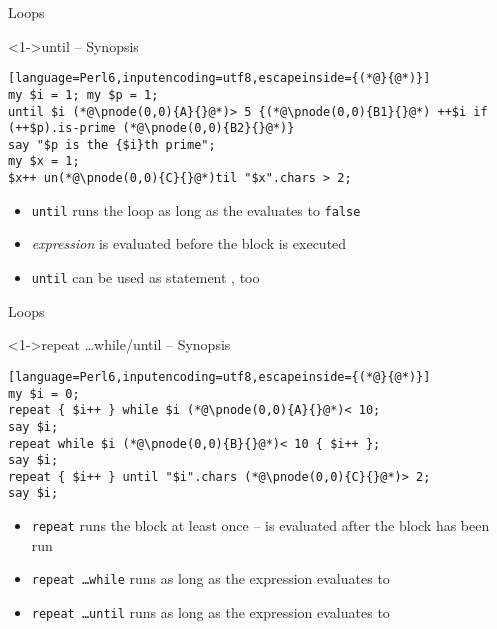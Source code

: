 \begin{frame}[fragile]{Loops}
\begin{block}<1->{until -- Synopsis}
\small
\begin{lstlisting}[language=Perl6,inputencoding=utf8,escapeinside={(*@}{@*)}]
my $i = 1; my $p = 1;
until $i (*@\pnode(0,0){A}{}@*)> 5 {(*@\pnode(0,0){B1}{}@*) ++$i if (++$p).is-prime (*@\pnode(0,0){B2}{}@*)}
say "$p is the {$i}th prime";
my $x = 1;
$x++ un(*@\pnode(0,0){C}{}@*)til "$x".chars > 2;
\end{lstlisting}%
\end{block}

\begin{itemize}
\item<2-> \texttt{until} runs the loop as long as the  evaluates to \texttt{false}
\item<3-> \textit{expression} is evaluated before the block is executed
\item<5-> \texttt{until} can be used as statement , too
\end{itemize}
\end{frame}

\begin{frame}[fragile]{Loops}
\begin{block}<1->{repeat \ldots while/until -- Synopsis}
\small
\begin{lstlisting}[language=Perl6,inputencoding=utf8,escapeinside={(*@}{@*)}]
my $i = 0;
repeat { $i++ } while $i (*@\pnode(0,0){A}{}@*)< 10;
say $i;
repeat while $i (*@\pnode(0,0){B}{}@*)< 10 { $i++ };
say $i;
repeat { $i++ } until "$i".chars (*@\pnode(0,0){C}{}@*)> 2;
say $i;
\end{lstlisting}
\end{block}

\begin{itemize}
\item<2-> \texttt{repeat} runs the block at least once --  is evaluated after the block has been run
\item<3-> \texttt{repeat \ldots while} runs as long as the expression evaluates to 
\item<4-> \texttt{repeat \ldots until} runs as long as the expression evaluates to 
\end{itemize}
\end{frame}

